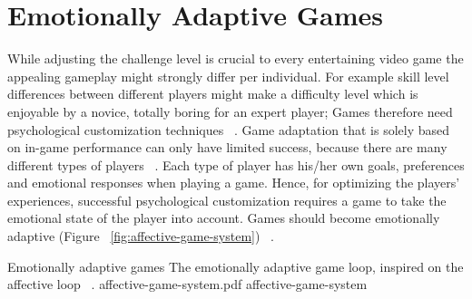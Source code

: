 \section{Emotionally Adaptive Games}

While adjusting the challenge level is crucial to every entertaining video game the appealing gameplay might strongly differ per individual. For example skill level differences between different players might make a difficulty level which is enjoyable by a novice, totally boring for an expert player; Games therefore need psychological customization techniques ~\cite{saari2005towards}. Game adaptation that is solely based on in-game performance can only have limited success, because there are many different types of players ~\cite{onlin2014bartle}. Each type of player has his/her own goals, preferences and emotional responses when playing a game. Hence, for optimizing the players' experiences, successful psychological customization requires a game to take the emotional state of the player into account. Games should become emotionally adaptive (Figure ~\ref{fig:affective-game-system}) ~\cite{tijs2009creating}.

\img
{Emotionally adaptive games}
{The emotionally adaptive game loop, inspired on the affective loop ~\cite{sundstrom2005user}.}
{affective-game-system.pdf}
{affective-game-system}



